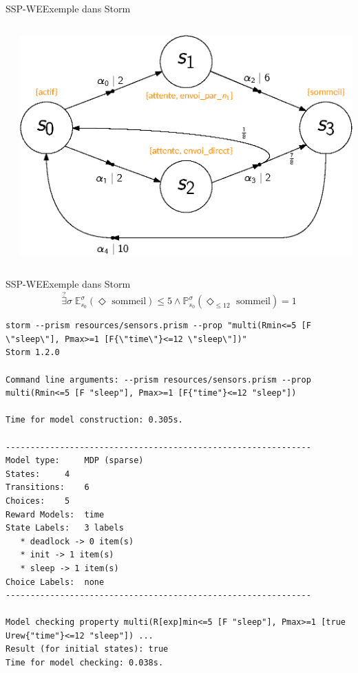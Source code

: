 \documentclass[compress]{beamer}
\theoremstyle{theorem}%
\begin{document}
\begin{frame}{SSP-WE}{Exemple dans Storm}
  \scriptsize
  \begin{columns}
    \begin{column}{0.5\linewidth}
  
    \end{column}
    \begin{column}{0.5\linewidth}
      \begin{center}
        \includegraphics[width=\linewidth]{resources/main-mdp3}
      \end{center}
    \end{column}
  \end{columns}
\end{frame}

\begin{frame}[fragile]{SSP-WE}{Exemple dans Storm}
    \vspace{-0.05\linewidth}
    \[ \overset{?}{\exists} \sigma \; \mathbb{E}^{\sigma}_{s_0}(\Diamond \text{ sommeil}) \leq 5 \wedge \mathbb{P}^\sigma_{s_0}(\Diamond_{\leq 12} \text{ sommeil}) = 1 \]
  {\fontsize{4}{5}
  \begin{verbatim}
storm --prism resources/sensors.prism --prop "multi(Rmin<=5 [F \"sleep\"], Pmax>=1 [F{\"time\"}<=12 \"sleep\"])"
Storm 1.2.0

Command line arguments: --prism resources/sensors.prism --prop multi(Rmin<=5 [F "sleep"], Pmax>=1 [F{"time"}<=12 "sleep"])

Time for model construction: 0.305s.

--------------------------------------------------------------
Model type: 	MDP (sparse)
States: 	4
Transitions: 	6
Choices: 	5
Reward Models:  time
State Labels: 	3 labels
   * deadlock -> 0 item(s)
   * init -> 1 item(s)
   * sleep -> 1 item(s)
Choice Labels: 	none
--------------------------------------------------------------

Model checking property multi(R[exp]min<=5 [F "sleep"], Pmax>=1 [true Urew{"time"}<=12 "sleep"]) ...
Result (for initial states): true
Time for model checking: 0.038s.
  \end{verbatim}
  }
\end{frame}
\end{document}
